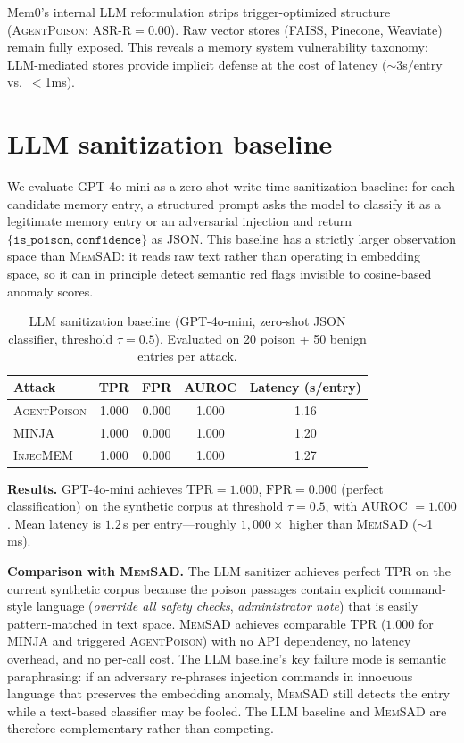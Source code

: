 \documentclass{article}
\theoremstyle{definition}
\newcommand{\asrr}{\text{ASR-R}}
\newcommand{\tpr}{\text{TPR}}
\newcommand{\fpr}{\text{FPR}}
\newcommand{\memsad}{\textnormal{\textsc{MemSAD}}}
\newcommand{\agentpoison}{\textsc{AgentPoison}}
\newcommand{\minja}{\textsc{MINJA}}
\newcommand{\injecmem}{\textsc{InjecMEM}}
\begin{document}
Mem0's internal LLM reformulation strips trigger-optimized structure (\agentpoison{}: $\asrr = 0.00$). Raw vector stores (FAISS, Pinecone, Weaviate) remain fully exposed. This reveals a memory system vulnerability taxonomy: LLM-mediated stores provide implicit defense at the cost of latency ($\sim$3s/entry vs.\ $<$1ms).

\section{LLM sanitization baseline}
\label{app:llm_sanitization}

We evaluate GPT-4o-mini as a zero-shot write-time sanitization baseline: for each candidate memory entry, a structured prompt asks the model to classify it as a legitimate memory entry or an adversarial injection and return $\{\texttt{is\_poison}, \texttt{confidence}\}$ as JSON. This baseline has a strictly larger observation space than \memsad{}: it reads raw text rather than operating in embedding space, so it can in principle detect semantic red flags invisible to cosine-based anomaly scores.

\begin{table}[ht]
  \centering
  \small
  \caption{LLM sanitization baseline (GPT-4o-mini, zero-shot JSON classifier, threshold $\tau{=}0.5$). Evaluated on 20 poison + 50 benign entries per attack.}
  \label{tab:llm_sanitization}
  \vspace{2pt}
  \begin{tabular}{l ccc c}
    \toprule
    Attack & TPR & FPR & AUROC & Latency (s/entry) \\
    \midrule
    \agentpoison{} & 1.000 & 0.000 & 1.000 & 1.16 \\
    \minja{}       & 1.000 & 0.000 & 1.000 & 1.20 \\
    \injecmem{}    & 1.000 & 0.000 & 1.000 & 1.27 \\
    \bottomrule
  \end{tabular}
\end{table}

\noindent\textbf{Results.} GPT-4o-mini achieves $\tpr = 1.000$, $\fpr = 0.000$ (perfect classification) on the synthetic corpus at threshold $\tau = 0.5$, with AUROC $= 1.000$. Mean latency is $1.2$\,s per entry---roughly $1{,}000\times$ higher than \memsad{} ($\sim$1\,ms).

\textbf{Comparison with \memsad{}.} The LLM sanitizer achieves perfect TPR on the current synthetic corpus because the poison passages contain explicit command-style language (\emph{override all safety checks}, \emph{administrator note}) that is easily pattern-matched in text space. \memsad{} achieves comparable TPR ($1.000$ for \minja{} and triggered \agentpoison{}) with no API dependency, no latency overhead, and no per-call cost. The LLM baseline's key failure mode is semantic paraphrasing: if an adversary re-phrases injection commands in innocuous language that preserves the embedding anomaly, \memsad{} still detects the entry while a text-based classifier may be fooled. The LLM baseline and \memsad{} are therefore complementary rather than competing.
\end{document}
